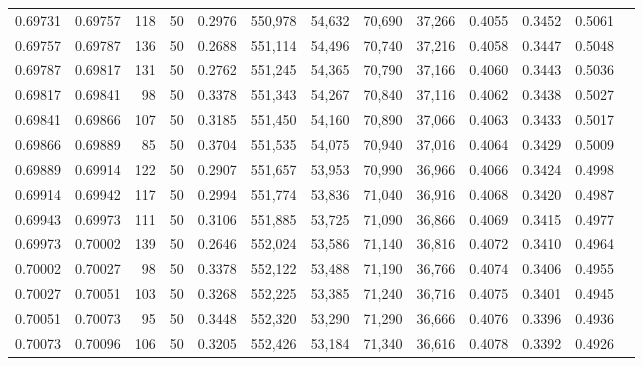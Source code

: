 \begin{tabular}{rrrrrrrrrrrrr}
0.69731 & 0.69757 &   118 &  50 &                                     0.2976 & 550,978 &  54,632 &  70,690 &  37,266 & 0.4055 & 0.3452 & 0.5061 \\
0.69757 & 0.69787 &   136 &  50 &                                     0.2688 & 551,114 &  54,496 &  70,740 &  37,216 & 0.4058 & 0.3447 & 0.5048 \\
0.69787 & 0.69817 &   131 &  50 &                                     0.2762 & 551,245 &  54,365 &  70,790 &  37,166 & 0.4060 & 0.3443 & 0.5036 \\
0.69817 & 0.69841 &    98 &  50 &                                     0.3378 & 551,343 &  54,267 &  70,840 &  37,116 & 0.4062 & 0.3438 & 0.5027 \\
0.69841 & 0.69866 &   107 &  50 &                                     0.3185 & 551,450 &  54,160 &  70,890 &  37,066 & 0.4063 & 0.3433 & 0.5017 \\
0.69866 & 0.69889 &    85 &  50 &                                     0.3704 & 551,535 &  54,075 &  70,940 &  37,016 & 0.4064 & 0.3429 & 0.5009 \\
0.69889 & 0.69914 &   122 &  50 &                                     0.2907 & 551,657 &  53,953 &  70,990 &  36,966 & 0.4066 & 0.3424 & 0.4998 \\
0.69914 & 0.69942 &   117 &  50 &                                     0.2994 & 551,774 &  53,836 &  71,040 &  36,916 & 0.4068 & 0.3420 & 0.4987 \\
0.69943 & 0.69973 &   111 &  50 &                                     0.3106 & 551,885 &  53,725 &  71,090 &  36,866 & 0.4069 & 0.3415 & 0.4977 \\
0.69973 & 0.70002 &   139 &  50 &                                     0.2646 & 552,024 &  53,586 &  71,140 &  36,816 & 0.4072 & 0.3410 & 0.4964 \\
0.70002 & 0.70027 &    98 &  50 &                                     0.3378 & 552,122 &  53,488 &  71,190 &  36,766 & 0.4074 & 0.3406 & 0.4955 \\
0.70027 & 0.70051 &   103 &  50 &                                     0.3268 & 552,225 &  53,385 &  71,240 &  36,716 & 0.4075 & 0.3401 & 0.4945 \\
0.70051 & 0.70073 &    95 &  50 &                                     0.3448 & 552,320 &  53,290 &  71,290 &  36,666 & 0.4076 & 0.3396 & 0.4936 \\
0.70073 & 0.70096 &   106 &  50 &                                     0.3205 & 552,426 &  53,184 &  71,340 &  36,616 & 0.4078 & 0.3392 & 0.4926 \\

\end{tabular}
